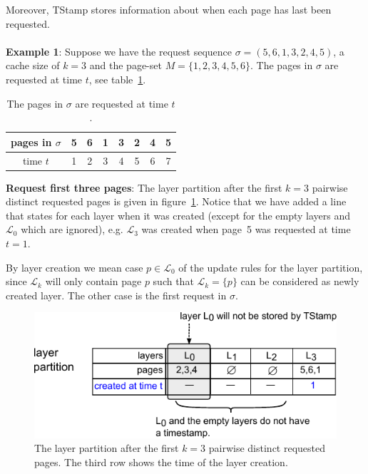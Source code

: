 \documentclass[a4paper,12pt, titlepage]{article}  %
\newcommand{\cl}{\mathcal{L}}   %
\begin{document}
Moreover, TStamp stores information about when each page has last been requested. \\
\\
\textbf{Example 1}: Suppose we have the request sequence $\sigma=(5,6,1,3,2,4,5)$, 
a cache size of $k=3$ and the page-set $M=\{1,2,3,4,5,6\}$. The pages in $\sigma$ are requested at time $t$, 
see table~\ref{tab:timestamps}.

\begin{table}[htp]
\begin{center}
	\begin{tabular}{|c||c|c|c|c|c|c|c|}
	  	\hline
		pages in $\sigma$ & 5 & 6 & 1 & 3 & 2 & 4 & 5\\
		\hline		
		time $t$               & 1 & 2 & 3 & 4 & 5 & 6 & 7\\
		\hline
	\end{tabular}
	\caption{The pages in $\sigma$ are requested at time $t$.}
        \label{tab:timestamps}
\end{center}
\end{table}

\noindent \textbf{Request first three pages}: The layer partition after the first $k=3$ pairwise distinct requested pages is given in figure~\ref{fig:TStamp_layerPartition}.
Notice that we have added a line that states for each layer when it was created (except for the empty layers and $\cl_0$ which
are ignored), e.g. $\cl_3$ was created when page~5 was requested at time $t=1$. 

By layer creation we mean case $p \in \cl_0$ of the update rules for the layer partition, since $\cl_k$ will only contain
page $p$ such that $\cl_k = \{p\}$ can be considered as newly created layer. The other case is the first request in $\sigma$. 

\begin{figure}[htp]
	\centering
	\includegraphics[scale=0.95]{./figures/TStamp_layerPartition.pdf}
	\caption{The layer partition after the first $k=3$ pairwise distinct requested pages. The third
                     row shows the time of the layer creation. } 
	\label{fig:TStamp_layerPartition}
\end{figure}
\end{document}
